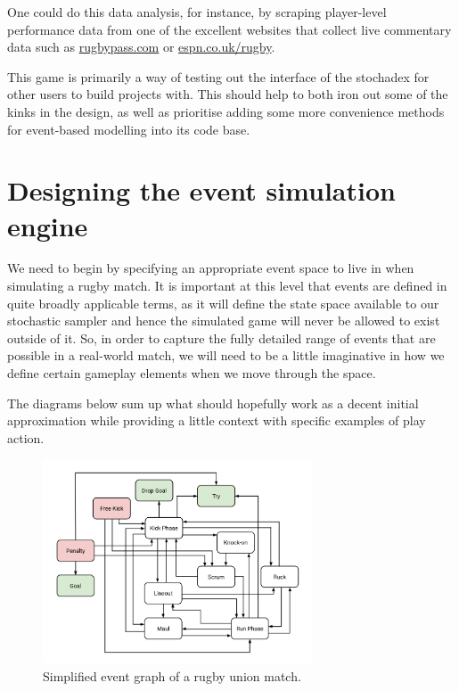 \documentclass{book}
\begin{document}
One could do this data analysis, for instance, by scraping player-level performance data from one of the excellent websites that collect live commentary data such as \href{https://www.rugbypass.com/}{rugbypass.com} or \href{https://www.espn.co.uk/rugby/}{espn.co.uk/rugby}.

This game is primarily a way of testing out the interface of the stochadex for other users to build projects with. This should help to both iron out some of the kinks in the design, as well as prioritise adding some more convenience methods for event-based modelling into its code base.

\section{\sffamily Designing the event simulation engine}

We need to begin by specifying an appropriate event space to live in when simulating a rugby match. It is important at this level that events are defined in quite broadly applicable terms, as it will define the state space available to our stochastic sampler and hence the simulated game will never be allowed to exist outside of it. So, in order to capture the fully detailed range of events that are possible in a real-world match, we will need to be a little imaginative in how we define certain gameplay elements when we move through the space.

The diagrams below sum up what should hopefully work as a decent initial approximation while providing a little context with specific examples of play action.

\begin{figure}[h]
\includegraphics[width=8cm]{images/trywizard-event-graph.png}
\caption{Simplified event graph of a rugby union match.}
\label{fig:event-graph}
\end{figure}
\end{document}
